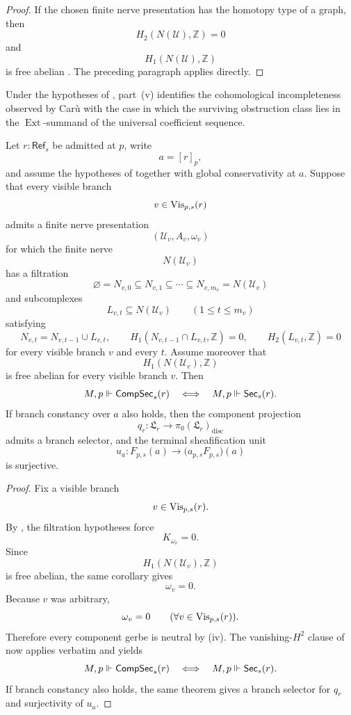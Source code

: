 \begin{proof}
If the chosen finite nerve presentation has the homotopy type of a graph, then
\[
H_2(N(\mathcal U),\mathbb Z)=0
\]
and
\[
H_1(N(\mathcal U),\mathbb Z)
\]
is free abelian \cite[Secs.~2.1, 2.2]{Hatcher2002}. The preceding paragraph applies directly.
\end{proof}

\begin{remark}\label{rem:caru-ext-residual}
Under the hypotheses of , part~(v) identifies the cohomological incompleteness observed by Car\`u \cite{Caru2017} with the case in which the surviving obstruction class lies in the $\operatorname{Ext}$-summand of the universal coefficient sequence.
\end{remark}

\begin{corollary}\label{cor:piecewise-h2-trivial-no-glue}
Let $r:\mathsf{Ref}_s$ be admitted at $p$, write
\[
a=[r]_p,
\]
and assume the hypotheses of  together with global conservativity at $a$. Suppose that every visible branch
\[
v\in \mathrm{Vis}_{p,s}(r)
\]
admits a finite nerve presentation
\[
(\mathcal U_v,A_v,\omega_v)
\]
for which the finite nerve
\[
N(\mathcal U_v)
\]
has a filtration
\[
\varnothing=N_{v,0}\subseteq N_{v,1}\subseteq \cdots \subseteq N_{v,m_v}=N(\mathcal U_v)
\]
and subcomplexes
\[
L_{v,t}\subseteq N(\mathcal U_v)
\qquad
(1\le t\le m_v)
\]
satisfying
\[
N_{v,t}=N_{v,t-1}\cup L_{v,t},
\qquad
H_1(N_{v,t-1}\cap L_{v,t},\mathbb Z)=0,
\qquad
H_2(L_{v,t},\mathbb Z)=0
\]
for every visible branch $v$ and every $t$. Assume moreover that
\[
H_1(N(\mathcal U_v),\mathbb Z)
\]
is free abelian for every visible branch $v$. Then
\[
M,p\Vdash \mathsf{CompSec}_s(r)
\quad\Longleftrightarrow\quad
M,p\Vdash \mathsf{Sec}_s(r).
\]
If branch constancy over $a$ also holds, then the component projection
\[
q_r:\mathfrak L_r\to \pi_0(\mathfrak L_r)_{\mathrm{disc}}
\]
admits a branch selector, and the terminal sheafification unit
\[
u_a:F_{p,s}(a)\to \bigl(a_{p,s}F_{p,s}\bigr)(a)
\]
is surjective.
\end{corollary}

\begin{proof}
Fix a visible branch
\[
v\in \mathrm{Vis}_{p,s}(r).
\]
By , the filtration hypotheses force
\[
K_{\omega_v}=0.
\]
Since
\[
H_1(N(\mathcal U_v),\mathbb Z)
\]
is free abelian, the same corollary gives
\[
\omega_v=0.
\]
Because $v$ was arbitrary,
\[
\omega_v=0
\qquad
(\forall v\in \mathrm{Vis}_{p,s}(r)).
\]
Therefore every component gerbe is neutral by (iv). The vanishing-$H^2$ clause of  now applies verbatim and yields
\[
M,p\Vdash \mathsf{CompSec}_s(r)
\quad\Longleftrightarrow\quad
M,p\Vdash \mathsf{Sec}_s(r).
\]
If branch constancy also holds, the same theorem gives a branch selector for $q_r$ and surjectivity of $u_a$.
\end{proof}
